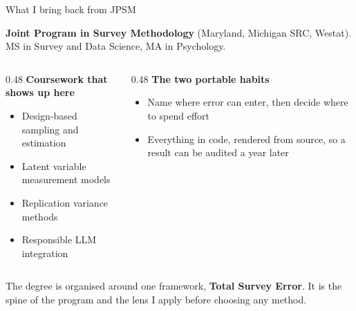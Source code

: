 \documentclass[
  ignorenonframetext,
  aspectratio=169,
]{beamer}
\newcommand{\kicker}[1]{\par\noindent{\footnotesize\color{vteal}\textbf{\MakeUppercase{#1}}}\par\vspace{0.4em}}
\begin{document}
\begin{frame}[shrink]{What I bring back from JPSM}
\label{what-i-bring-back-from-jpsm}
\kicker{where i trained}

\small

\textbf{Joint Program in Survey Methodology} (Maryland, Michigan SRC,
Westat). MS in Survey and Data Science, MA in Psychology.

\vspace{0.5em}

\begin{columns}[T]
\begin{column}{0.48\textwidth}
\textbf{Coursework that shows up here}
\begin{itemize}\itemsep2pt
  \item Design-based sampling and estimation
  \item Latent variable measurement models
  \item Replication variance methods
  \item Responsible LLM integration
\end{itemize}
\end{column}
\begin{column}{0.48\textwidth}
\textbf{The two portable habits}
\begin{itemize}\itemsep2pt
  \item Name where error can enter, then decide where to spend effort
  \item Everything in code, rendered from source, so a result can be audited a year later
\end{itemize}
\end{column}
\end{columns}

\vspace{0.5em}

\begin{center}
\colorbox{vteal!15}{\parbox{0.93\textwidth}{\centering
The degree is organised around one framework, \textbf{Total Survey Error}. It is the spine of the program and the lens I apply before choosing any method.}}
\end{center}

\end{frame}
\end{document}
